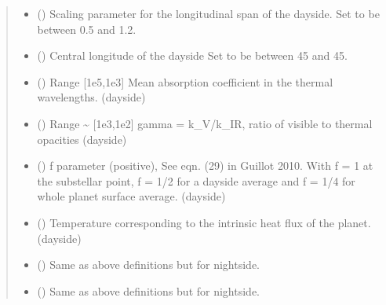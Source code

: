 \documentclass[letterpaper,10pt,english]{sphinxmanual}
\begin{document}
\begin{fulllineitems}
\begin{quote}
\begin{description}
\begin{itemize}
\item {} 
\sphinxAtStartPar
{} () \textendash{} Scaling parameter for the longitudinal span of the dayside.
Set to be between 0.5 and 1.2.

\item {} 
\sphinxAtStartPar
{} () \textendash{} Central longitude of the dayside
Set to be between \sphinxhyphen{}45 and 45.

\item {} 
\sphinxAtStartPar
{} () \textendash{} Range {[}1e\sphinxhyphen{}5,1e3{]}
Mean absorption coefficient in the thermal wavelengths. (dayside)

\item {} 
\sphinxAtStartPar
{} () \textendash{} Range \textasciitilde{} {[}1e\sphinxhyphen{}3,1e2{]}
gamma = k\_V/k\_IR, ratio of visible to thermal opacities (dayside)

\item {} 
\sphinxAtStartPar
{} () \textendash{} f parameter (positive), See eqn. (29) in Guillot 2010.
With f = 1 at the substellar point, f = 1/2 for a
day\sphinxhyphen{}side average and f = 1/4 for whole planet surface average. (dayside)

\item {} 
\sphinxAtStartPar
{} () \textendash{} Temperature corresponding to the intrinsic heat flux of the planet.
(dayside)

\item {} 
\sphinxAtStartPar
{} () \textendash{} Same as above definitions but for nightside.

\item {} 
\sphinxAtStartPar
{} () \textendash{} Same as above definitions but for nightside.


\end{itemize}
\end{description}
\end{quote}
\end{fulllineitems}
\end{document}
